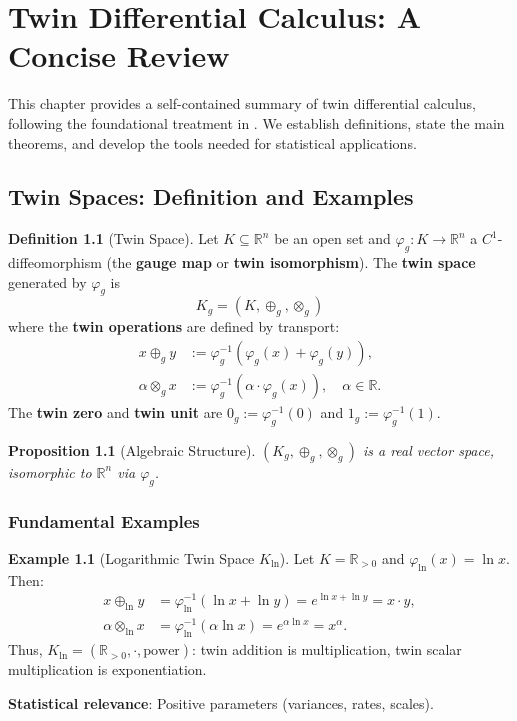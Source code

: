 \documentclass[11pt,twoside]{book}
\theoremstyle{plain}
\newtheorem{proposition}[theorem]{Proposition}
\theoremstyle{definition}
\newtheorem{definition}[theorem]{Definition}
\newtheorem{example}[theorem]{Example}
\theoremstyle{remark}
\newcommand{\R}{\mathbb{R}}
\newcommand{\tplus}{\oplus_g}
\newcommand{\ttimes}{\otimes_g}
\newcommand{\Kg}{K_g}
\newcommand{\Kln}{K_{\ln}}
\newcommand{\Rpos}{\R_{>0}}
\begin{document}

\chapter{Twin Differential Calculus: A Concise Review}
\label{ch:twin_review}

This chapter provides a self-contained summary of twin differential calculus, following the foundational treatment in \cite{nembe2025}. We establish definitions, state the main theorems, and develop the tools needed for statistical applications.

\section{Twin Spaces: Definition and Examples}
\label{sec:twin_definition}

\begin{definition}[Twin Space]
    \label{def:twin_space}
    Let $K \subseteq \R^n$ be an open set and $\varphi_g : K \to \R^n$ a $C^1$-diffeomorphism (the \textbf{gauge map} or \textbf{twin isomorphism}). The \textbf{twin space} generated by $\varphi_g$ is
    \[
    \Kg = (K, \tplus, \ttimes)
    \]
    where the \textbf{twin operations} are defined by transport:
    \begin{align}
        x \tplus y &:= \varphi_g^{-1}(\varphi_g(x) + \varphi_g(y)), \\
        \alpha \ttimes x &:= \varphi_g^{-1}(\alpha \cdot \varphi_g(x)), \quad \alpha \in \R.
    \end{align}
    The \textbf{twin zero} and \textbf{twin unit} are $0_g := \varphi_g^{-1}(0)$ and $1_g := \varphi_g^{-1}(1)$.
\end{definition}

\begin{proposition}[Algebraic Structure]
    $(\Kg, \tplus, \ttimes)$ is a real vector space, isomorphic to $\R^n$ via $\varphi_g$.
\end{proposition}

\subsection{Fundamental Examples}

\begin{example}[Logarithmic Twin Space $\Kln$]
    \label{ex:log_twin}
    Let $K = \Rpos$ and $\varphi_{\ln}(x) = \ln x$. Then:
    \begin{align}
        x \oplus_{\ln} y &= \varphi_{\ln}^{-1}(\ln x + \ln y) = e^{\ln x + \ln y} = x \cdot y, \\
        \alpha \otimes_{\ln} x &= \varphi_{\ln}^{-1}(\alpha \ln x) = e^{\alpha \ln x} = x^\alpha.
    \end{align}
    Thus, $\Kln = (\Rpos, \cdot, \text{power})$: twin addition is multiplication, twin scalar multiplication is exponentiation.
    
    \textbf{Statistical relevance}: Positive parameters (variances, rates, scales).
\end{example}
\end{document}
